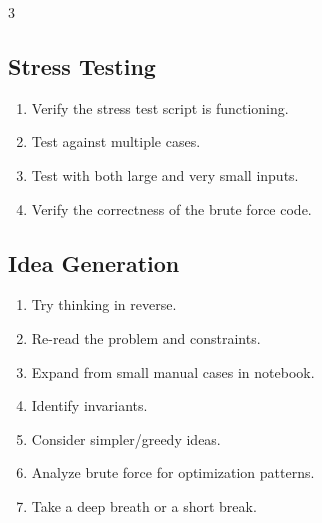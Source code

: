 \begin{multicols*}{3}
\subsection{Stress Testing}
\begin{enumerate}
    \item Verify the stress test script is functioning.
    \item Test against multiple cases.
    \item Test with both large and very small inputs.
    \item Verify the correctness of the brute force code.
\end{enumerate}

\subsection{Idea Generation}
\begin{enumerate}
    \item Try thinking in reverse.
    \item Re-read the problem and constraints.
    \item Expand from small manual cases in notebook.
    \item Identify invariants.
    \item Consider simpler/greedy ideas.
    \item Analyze brute force for optimization patterns.
    \item Take a deep breath or a short break.
\end{enumerate}
\end{multicols*}